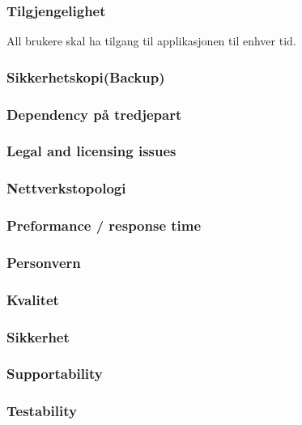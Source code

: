 \documentclass[12pt]{article}
\begin{document}
        \subsubsection{Tilgjengelighet}
        All brukere skal ha tilgang til applikasjonen til enhver tid.
        
        \subsubsection{Sikkerhetskopi(Backup)}


        \subsubsection{Dependency på tredjepart}


        \subsubsection{Legal and licensing issues}


        \subsubsection{Nettverkstopologi}


        \subsubsection{Preformance / response time}


        \subsubsection{Personvern}


        \subsubsection{Kvalitet}


        \subsubsection{Sikkerhet}


        \subsubsection{Supportability}


        \subsubsection{Testability}
        
\end{document}
